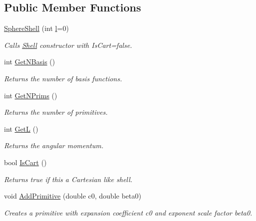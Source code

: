 \subsection*{Public Member Functions}
\begin{DoxyCompactItemize}
\item 
\hyperlink{classJKBuilder_1_1SphereShell_af92e2c0e6f04dbf41105b543a6eebdcd}{SphereShell} (int \hyperlink{classJKBuilder_1_1Shell_a89606eca6b563ec68d2da2e84657736f}{l}=0)
\begin{DoxyCompactList}\small\item\em Calls \hyperlink{classJKBuilder_1_1Shell}{Shell} constructor with IsCart=false. \item\end{DoxyCompactList}\item 
int \hyperlink{classJKBuilder_1_1SphereShell_a297c144fb990284ac5973c99cdd55f91}{GetNBasis} ()
\begin{DoxyCompactList}\small\item\em Returns the number of basis functions. \item\end{DoxyCompactList}\item 
int \hyperlink{classJKBuilder_1_1Shell_abc886cd4e35d3c56a0250b7d06986f61}{GetNPrims} ()
\begin{DoxyCompactList}\small\item\em Returns the number of primitives. \item\end{DoxyCompactList}\item 
int \hyperlink{classJKBuilder_1_1Shell_a7cc8fc5bc043267a7b47e69503e0e308}{GetL} ()
\begin{DoxyCompactList}\small\item\em Returns the angular momentum. \item\end{DoxyCompactList}\item 
bool \hyperlink{classJKBuilder_1_1Shell_a75c22d97e837f5c439eb51aa223bed98}{IsCart} ()
\begin{DoxyCompactList}\small\item\em Returns true if this a Cartesian like shell. \item\end{DoxyCompactList}\item 
void \hyperlink{classJKBuilder_1_1Shell_a20ec923cb07d5d3762fffa4501d09924}{AddPrimitive} (double c0, double beta0)
\begin{DoxyCompactList}\small\item\em Creates a primitive with expansion coefficient c0 and exponent scale factor beta0. \item\end{DoxyCompactList}\item 

\end{DoxyCompactItemize}
